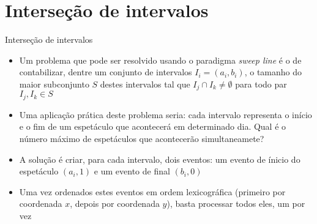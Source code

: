 \section{Interseção de intervalos}

\begin{frame}[fragile]{Interseção de intervalos}

    \begin{itemize}
        \item Um problema que pode ser resolvido usando o paradigma \textit{sweep line} é o de
            contabilizar, dentre um conjunto de intervalos $I_i = (a_i, b_i)$, o tamanho do maior 
            subconjunto $S$ destes intervalos tal que $I_j \cap I_k \neq \emptyset$ para todo
            par $I_j, I_k\in S$ 

        \item Uma aplicação prática deste problema seria: cada intervalo representa o início e o
            fim de um espetáculo que acontecerá em determinado dia. Qual é o número máximo de
            espetáculos que acontecerão simultaneamete?

        \item A solução é criar, para cada intervalo, dois eventos: um evento de ínicio do 
            espetáculo $(a_i, 1)$ e um evento de final $(b_i, 0)$

        \item Uma vez ordenados estes eventos em ordem lexicográfica (primeiro por coordenada $x$,
            depois por coordenada $y$), basta processar todos eles, um por vez

    \end{itemize}

\end{frame}

